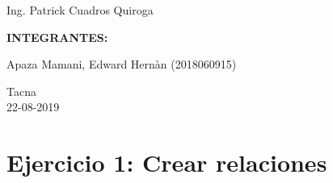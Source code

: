 \documentclass[12pt,letterpaper]{article}
\begin{document}
\begin{titlepage}
\begin{center}
\vspace*{0.1in}
\begin{large}
 Ing. Patrick Cuadros Quiroga\\
\end{large}

\vspace*{0.4in}
\vspace*{0.1in}
\begin{large}
\textbf{INTEGRANTES:} \\
\begin{flushleft}
Apaza Mamani, Edward Hernàn \hfill	(2018060915)\\

\centering  %
\vspace*{0.9in}
\begin{large}
Tacna\\ 22-08-2019
\end{large}

\end{flushleft}
\end{large}
\end{center}

\end{titlepage}


\tableofcontents %
\thispagestyle{empty} %
\newpage
\setcounter{page}{1} %


\section{Ejercicio 1: Crear relaciones} 
\end{document}
